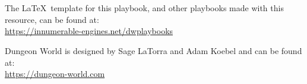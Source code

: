 \documentclass[darkmode]{dw_playbook}
\begin{document}


\clearpage

\begin{minipage}[t]{0.1\textwidth}
    ~ %
\end{minipage}
\begin{minipage}[t]{0.8\textwidth}
    ~\vgap %

    The \LaTeX~template for this playbook, and other playbooks made with this resource, can be found at:\\\url{https://innumerable-engines.net/dwplaybooks}
    ~\vgap

    Dungeon World is designed by Sage LaTorra and Adam Koebel and can be found at:\\\url{https://dungeon-world.com}
\end{minipage}
\begin{minipage}[t]{0.1\textwidth}
    ~ %
\end{minipage}
\end{document}
